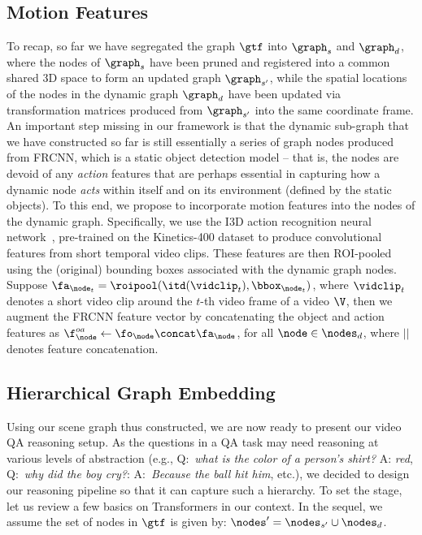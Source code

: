 \documentclass[letterpaper]{article}
\begin{document}
\subsection{Motion Features}
To recap, so far we have segregated the graph $\gtf$ into $\graph_s$ and $\graph_d$, where the nodes of $\graph_s$ have been pruned and registered into a common shared 3D space to form an updated graph $\graph_{s'}$, while the spatial locations of the nodes in the dynamic graph $\graph_d$ have been updated via transformation matrices produced from $\graph_{s'}$ into the same coordinate frame. An important step missing in our framework is that the dynamic sub-graph that we have constructed so far is still essentially a series of graph nodes produced from FRCNN, which is a static object detection model -- that is, the nodes are devoid of any \emph{action} features that are perhaps essential in capturing how a dynamic node \emph{acts} within itself and on its environment (defined by the static objects). To this end, we propose to incorporate motion features into the nodes of the dynamic graph. Specifically, we use the I3D action recognition neural network~\cite{carreira2017quo}, pre-trained on the Kinetics-400 dataset to produce convolutional features from short temporal video clips. These features are then ROI-pooled using the (original) bounding boxes associated with the dynamic graph nodes. Suppose $\fa_{\node_t}=\roipool(\itd(\vidclip_t), \bbox_{\node_t})$, where $\vidclip_t$ denotes a short video clip around the $t$-th video frame of a video $\V$, then we augment the FRCNN feature vector by concatenating the object and action features as $\f^{oa}_\node \leftarrow \fo_\node \concat \fa_\node$, for all $\node\in\nodes_d$, where $||$ denotes feature concatenation.

\subsection{Hierarchical Graph Embedding}
Using our \name scene graph thus constructed, we are now ready to present our video QA reasoning setup. As the questions in a QA task may need reasoning at various levels of abstraction (e.g., Q:~\emph{what is the color of a person's shirt?} A: \emph{red}, Q:~\emph{why did the boy cry?}: A:~\emph{Because the ball hit him}, etc.), we decided to design our reasoning pipeline so that it can capture such a hierarchy. To set the stage, let us review a few basics on Transformers in our context. In the sequel, we assume the set of nodes in $\gtf$ is given by: $\nodes'=\nodes_{s'}\cup \nodes_d$.
\end{document}
